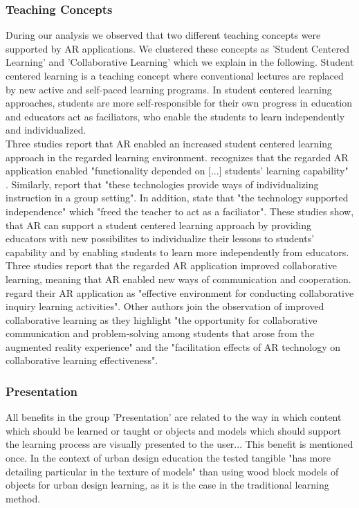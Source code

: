 {%
\subsubsection{Teaching Concepts}
During our analysis we observed that two different teaching concepts were supported by AR applications. We clustered these concepts as 'Student Centered Learning' and 'Collaborative Learning' which we explain in the following.
Student centered learning is a teaching concept where conventional lectures are replaced by new active and self-paced learning programs. In student centered learning approaches, students are more self-responsible for their own progress in education and educators act as faciliators, who enable the students to learn independently and individualized.\\
Three studies report that AR enabled an increased student centered learning approach in the regarded learning environment. \cite{VateULan.2012} recognizes that the regarded AR application enabled "functionality depended on [...] students’ learning capability" \autocite [894]{VateULan.2012}. Similarly, \cite{Kamarainen.2013} report that "these technologies provide ways of individualizing instruction in a group setting".\autocite[554]{Kamarainen.2013} In addition, \cite{Kamarainen.2013} state that "the technology supported independence" which "freed the teacher to act as a faciliator".\autocite[554]{Kamarainen.2013} These studies show, that AR can support a student centered learning approach by providing educators with new possibilites to individualize their lessons to students' capability and by enabling students to learn more independently from educators.
Three studies report that the regarded AR application improved collaborative learning, meaning that AR enabled new ways of communication and cooperation. \cite{Wang.2012} regard their AR application as "effective environment for conducting collaborative inquiry learning activities". \autocite[57]{Wang.2012} Other authors join the observation of improved collaborative learning as they highlight "the opportunity for collaborative communication and problem-solving among students that arose from the augmented reality experience" \autocite[552]{Kamarainen.2013} and the "facilitation effects of AR technology on collaborative learning effectiveness".\autocite[322]{Li.2011}
% 
\subsubsection{Presentation}
All benefits in the group 'Presentation' are related to the way in which content which should be learned or taught or objects and models which should support the learning process are visually presented to the user...  
This benefit is mentioned once. In the context of urban design education the tested tangible \AR "has more detailing particular in the texture of models"\autocite[17]{Chen.2008} than using wood block models of objects for urban 
design learning, as it is the case in the traditional learning method.

}
